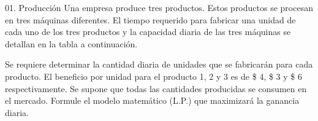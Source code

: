 \begin{frameExample}{01. Producción}{}
  Una empresa produce tres productos. Estos productos se procesan en tres máquinas diferentes. El tiempo requerido para fabricar una unidad de cada uno de los tres productos y la capacidad diaria de las tres máquinas se detallan en la tabla a continuación.

  {\centering
\par}

   Se requiere determinar la cantidad diaria de unidades que se fabricarán para cada producto. El beneficio por unidad para el producto 1, 2 y 3 es de \$ 4, \$ 3 y \$ 6 respectivamente. Se supone que todas las cantidades producidas se consumen en el mercado. Formule el modelo matemático (L.P.) que maximizará la ganancia diaria.
\end{frameExample}



